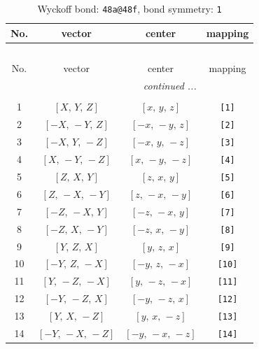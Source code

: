\documentclass[fleqn,8pt]{jsarticle}
\begin{document}
\begin{longtable}{cccc}
\caption{Wyckoff bond: {\tt 48a@48f}, bond symmetry: {\tt 1}}
 \\
 \hline \hline
No. & vector & center & mapping \\ \hline \endfirsthead

\multicolumn{3}{l}{\tablename\ \thetable{}} \\
 \hline \hline
No. & vector & center & mapping \\ \hline \endhead

 \hline \hline
\multicolumn{3}{r}{\footnotesize\it continued ...} \\ \endfoot

 \hline \hline
\multicolumn{3}{r}{} \\ \endlastfoot

1 & $\left[ X,\, Y,\, Z \right]$ & $\left[ x,\, y,\, z \right]$ & {\tt [1]} \\ \hline
2 & $\left[ - X,\, - Y,\, Z \right]$ & $\left[ - x,\, - y,\, z \right]$ & {\tt [2]} \\ \hline
3 & $\left[ - X,\, Y,\, - Z \right]$ & $\left[ - x,\, y,\, - z \right]$ & {\tt [3]} \\ \hline
4 & $\left[ X,\, - Y,\, - Z \right]$ & $\left[ x,\, - y,\, - z \right]$ & {\tt [4]} \\ \hline
5 & $\left[ Z,\, X,\, Y \right]$ & $\left[ z,\, x,\, y \right]$ & {\tt [5]} \\ \hline
6 & $\left[ Z,\, - X,\, - Y \right]$ & $\left[ z,\, - x,\, - y \right]$ & {\tt [6]} \\ \hline
7 & $\left[ - Z,\, - X,\, Y \right]$ & $\left[ - z,\, - x,\, y \right]$ & {\tt [7]} \\ \hline
8 & $\left[ - Z,\, X,\, - Y \right]$ & $\left[ - z,\, x,\, - y \right]$ & {\tt [8]} \\ \hline
9 & $\left[ Y,\, Z,\, X \right]$ & $\left[ y,\, z,\, x \right]$ & {\tt [9]} \\ \hline
10 & $\left[ - Y,\, Z,\, - X \right]$ & $\left[ - y,\, z,\, - x \right]$ & {\tt [10]} \\ \hline
11 & $\left[ Y,\, - Z,\, - X \right]$ & $\left[ y,\, - z,\, - x \right]$ & {\tt [11]} \\ \hline
12 & $\left[ - Y,\, - Z,\, X \right]$ & $\left[ - y,\, - z,\, x \right]$ & {\tt [12]} \\ \hline
13 & $\left[ Y,\, X,\, - Z \right]$ & $\left[ y,\, x,\, - z \right]$ & {\tt [13]} \\ \hline
14 & $\left[ - Y,\, - X,\, - Z \right]$ & $\left[ - y,\, - x,\, - z \right]$ & {\tt [14]} \\ \hline

\end{longtable}
\end{document}

